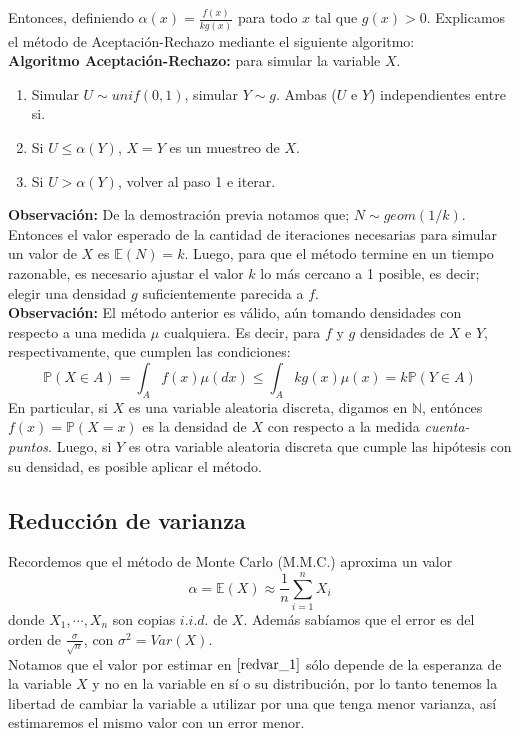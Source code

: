 \documentclass[a4paper]{article}
\newcommand{\prob}{\mathbb{P}}
\numberwithin{equation}{subsection}
\def\N{\mathbb N}
\def\E{\mathbb E}
\begin{document}
Entonces, definiendo $\alpha(x) = \frac{f(x)}{kg(x)}$ para todo $x$ tal que $g(x)>0$. Explicamos el método de Aceptación-Rechazo mediante el siguiente algoritmo:\\ \newline
\textbf{Algoritmo Aceptación-Rechazo:} para simular la variable $X$.
\begin{enumerate}
    \item Simular $U\sim unif(0,1)$, simular $Y\sim g$. Ambas ($U$ e $Y$) independientes entre si.
    \item Si $U\leq \alpha(Y)$, $X=Y$ es un muestreo de $X$.
    \item Si $U> \alpha(Y)$, volver al paso 1 e iterar.
\end{enumerate}
\newline
\textbf{Observación: }De la demostración previa notamos que; $N\sim geom(1/k)$. Entonces el valor esperado de la cantidad de iteraciones necesarias para simular un valor de $X$ es $\E(N) = k$. Luego, para que el método termine en un tiempo razonable, es necesario ajustar el valor $k$ lo más cercano a 1 posible, es decir; elegir una densidad $g$ suficientemente parecida a $f$.\\ \newline
\textbf{Observación: }El método anterior es válido, aún tomando densidades con respecto a una medida $\mu$ cualquiera. Es decir, para $f$ y $g$ densidades de $X$ e $Y$, respectivamente, que cumplen las condiciones:
\[\prob\left(X\in A\right) = \int_{A}f(x)\mu(dx) \leq \int_{A}kg(x)\mu(x) = k\prob\left(Y\in A\right)\]
En particular, si $X$ es una variable aleatoria discreta, digamos en $\N$, entónces $f(x) = \prob(X=x)$ es la densidad de $X$ con respecto a la medida \textit{cuenta-puntos}. Luego, si $Y$ es otra variable aleatoria discreta que cumple las hipótesis con su densidad, es posible aplicar el método.

\subsection{Reducción de varianza}
Recordemos que el método de Monte Carlo (M.M.C.) aproxima un valor
\begin{equation}
    \alpha = \E(X) \approx \frac{1}{n}\sum_{i=1}^{n}X_i
    \label{redvar_1}
\end{equation}
donde $X_1,\cdots,X_n$ son copias $i.i.d.$ de $X$. Además sabíamos que el error es del orden de
$\frac{\sigma}{\sqrt{n}}$, con $\sigma^2 = Var(X)$.\\
Notamos que el valor por estimar en $\ref{redvar_1}$ sólo depende de la esperanza de la variable $X$ y no en la variable en sí o su distribución, por lo tanto tenemos la libertad de cambiar la variable a utilizar por una que tenga menor varianza, así estimaremos el mismo valor con un error menor.
\end{document}
